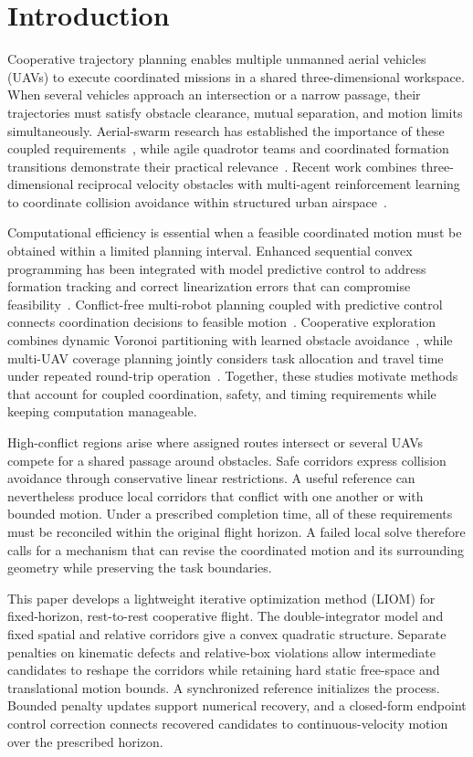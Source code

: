 \section{Introduction}
Cooperative trajectory planning enables multiple unmanned aerial vehicles (UAVs) to execute coordinated missions in a shared three-dimensional workspace. When several vehicles approach an intersection or a narrow passage, their trajectories must satisfy obstacle clearance, mutual separation, and motion limits simultaneously. Aerial-swarm research has established the importance of these coupled requirements~\cite{chung2018}, while agile quadrotor teams and coordinated formation transitions demonstrate their practical relevance~\cite{kushleyev2012,preiss2017}. Recent work combines three-dimensional reciprocal velocity obstacles with multi-agent reinforcement learning to coordinate collision avoidance within structured urban airspace~\cite{zhong2025rvo}.

Computational efficiency is essential when a feasible coordinated motion must be obtained within a limited planning interval. Enhanced sequential convex programming has been integrated with model predictive control to address formation tracking and correct linearization errors that can compromise feasibility~\cite{liu2025escp}. Conflict-free multi-robot planning coupled with predictive control connects coordination decisions to feasible motion~\cite{wu2025conflict}. Cooperative exploration combines dynamic Voronoi partitioning with learned obstacle avoidance~\cite{zhao2025exploration}, while multi-UAV coverage planning jointly considers task allocation and travel time under repeated round-trip operation~\cite{li2025coverage}. Together, these studies motivate methods that account for coupled coordination, safety, and timing requirements while keeping computation manageable.

High-conflict regions arise where assigned routes intersect or several UAVs compete for a shared passage around obstacles. Safe corridors express collision avoidance through conservative linear restrictions. A useful reference can nevertheless produce local corridors that conflict with one another or with bounded motion. Under a prescribed completion time, all of these requirements must be reconciled within the original flight horizon. A failed local solve therefore calls for a mechanism that can revise the coordinated motion and its surrounding geometry while preserving the task boundaries.

This paper develops a lightweight iterative optimization method (LIOM) for fixed-horizon, rest-to-rest cooperative flight. The double-integrator model and fixed spatial and relative corridors give a convex quadratic structure. Separate penalties on kinematic defects and relative-box violations allow intermediate candidates to reshape the corridors while retaining hard static free-space and translational motion bounds. A synchronized reference initializes the process. Bounded penalty updates support numerical recovery, and a closed-form endpoint control correction connects recovered candidates to continuous-velocity motion over the prescribed horizon.

